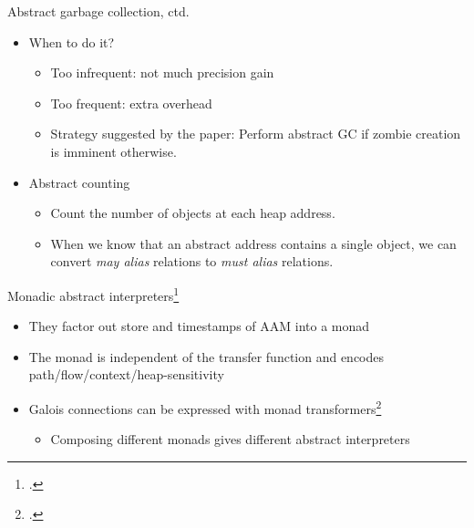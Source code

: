 \documentclass[aspectratio=169]{beamer}
\begin{document}
\begin{frame}{Abstract garbage collection, ctd.}
  \begin{itemize}[<+->]
  \item When to do it?
    \begin{itemize}
    \item Too infrequent: not much precision gain
    \item Too frequent: extra overhead\pause
    \item Strategy suggested by the paper: Perform abstract GC if zombie creation is imminent otherwise.
    \end{itemize}
  \item Abstract counting
    \begin{itemize}
    \item Count the number of objects at each heap address.
    \item When we know that an abstract address contains a single object, we can convert \emph{may alias} relations to \emph{must alias} relations.
    \end{itemize}
  \end{itemize}
\end{frame}

\begin{frame}{Monadic abstract interpreters\footcite{sergey2013monadic}}
  \begin{itemize}
  \item They factor out store and timestamps of AAM into a monad
  \item The monad is independent of the transfer function and encodes path/flow/context/heap-sensitivity
  \item Galois connections can be expressed with monad transformers\footcite{darais2015galois}
    \begin{itemize}
    \item  Composing different monads gives different abstract interpreters
    \end{itemize}
  \end{itemize}
\end{frame}
\end{document}
